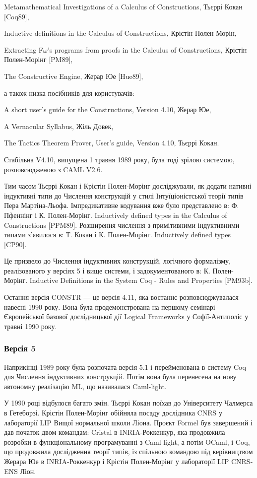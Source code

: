 \documentclass{article}
\begin{document}
Metamathematical Investigations of a Calculus of Constructions, Тьєррі Кокан [Coq89],

Inductive definitions in the Calculus of Constructions, Крістін Полен-Морін,

Extracting F$\omega$'s programs from proofs in the Calculus of Constructions, Крістін Полен-Морінг [PM89],

The Constructive Engine, Жерар Юе [Hue89],

а також низка посібників для користувачів:

A short user's guide for the Constructions, Version 4.10, Жерар Юе,

A Vernacular Syllabus, Жіль Довек,

The Tactics Theorem Prover, User's guide, Version 4.10, Тьєррі Кокан.

Стабільна V4.10, випущена 1 травня 1989 року, була тоді зрілою системою, розповсюдженою з CAML V2.6.

Тим часом Тьєррі Кокан і Крістін Полен-Морінг досліджували, як додати нативні індуктивні типи до Числення конструкцій у стилі Інтуїціоністської теорії типів Пера Мартіна-Льофа. Імпредикативне кодування вже було представлено в: Ф. Пфеннінг і К. Полен-Морінг. Inductively defined types in the Calculus of Constructions [PPM89]. Розширення числення з примітивними індуктивними типами з’явилося в: Т. Кокан і К. Полен-Морінг. Inductively defined types [CP90].

Це призвело до Числення індуктивних конструкцій, логічного формалізму, реалізованого у версіях 5 і вище системи, і задокументованого в: К. Полен-Морінг. Inductive Definitions in the System Coq - Rules and Properties [PM93b].

Остання версія CONSTR — це версія 4.11, яка востаннє розповсюджувалася навесні 1990 року. Вона була продемонстрована на першому семінарі Європейської базової дослідницької дії Logical Frameworks у Софії-Антиполіс у травні 1990 року.

\subsubsection{Версія 5}

Наприкінці 1989 року була розпочата версія 5.1 і перейменована в систему Coq для Числення індуктивних конструкцій. Потім вона була перенесена на нову автономну реалізацію ML, що називалася Caml-light.

У 1990 році відбулося багато змін. Тьєррі Кокан поїхав до Університету Чалмерса в Гетеборзі. Крістін Полен-Морінг обійняла посаду дослідника CNRS у лабораторії LIP Вищої нормальної школи Ліона. Проєкт Formel був завершений і дав початок двом командам: Cristal в INRIA-Роккенкур, яка продовжила розробки в функціональному програмуванні з Caml-light, а потім OCaml, і Coq, що продовжила дослідження теорії типів, із спільною командою під керівництвом Жерара Юе в INRIA-Роккенкур і Крістін Полен-Морінг у лабораторії LIP CNRS-ENS Ліон.
\end{document}
